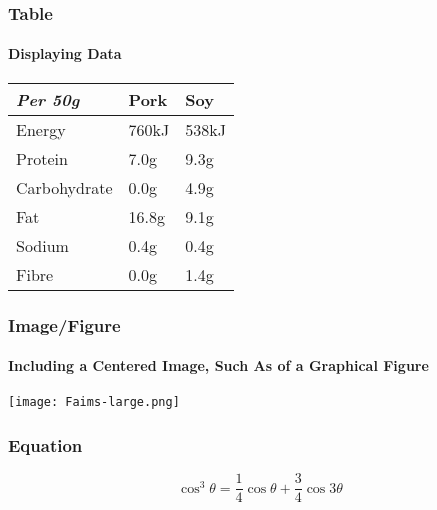 \documentclass[
	aspectratio=169, %
	12pt, %
	t, %
]{beamer}
\begin{document}
\begin{frame}
	\frametitle{Table}
	\framesubtitle{Displaying Data}

	\begin{table}
		\centering %
		\begin{tabular}{L{0.18\textwidth} R{0.11\textwidth} R{0.11\textwidth}}
			\toprule
			\textit{Per 50g} & \textbf{Pork} & \textbf{Soy} \\
			\midrule
			Energy & 760kJ & 538kJ\\
			Protein & 7.0g & 9.3g\\
			Carbohydrate & 0.0g & 4.9g\\
			Fat & 16.8g & 9.1g\\
			Sodium & 0.4g & 0.4g\\
			Fibre & 0.0g & 1.4g\\
			\bottomrule
		\end{tabular}
	\end{table}
\end{frame}


\begin{frame}
	\frametitle{Image/Figure}
	\framesubtitle{Including a Centered Image, Such As of a Graphical Figure}

	\begin{center}
		\texttt{[image: Faims-large.png]}
	\end{center}
\end{frame}


\begin{frame}
	\frametitle{Equation}

	\begin{equation}
		\cos^3 \theta =\frac{1}{4}\cos\theta+\frac{3}{4}\cos 3\theta
	\end{equation}
\end{frame}

\end{document}

